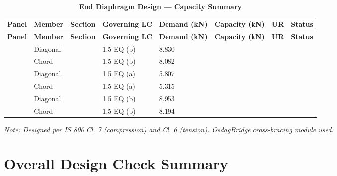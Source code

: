 \documentclass[12pt,a4paper]{report}
\numberwithin{table}{chapter}
\numberwithin{figure}{chapter}
\begin{document}
\begin{longtable}{|C{2.0cm}|L{1.8cm}|C{2.2cm}|C{3.0cm}|C{1.8cm}|C{1.8cm}|C{1.2cm}|C{1.8cm}|}
\caption{\textbf{End Diaphragm Design --- Capacity Summary}}
\hline
{} \textbf{Panel} & \textbf{Member} & \textbf{Section} & \textbf{Governing LC} & \textbf{Demand (kN)} & \textbf{Capacity (kN)} & \textbf{UR} & \textbf{Status} \\[6pt]
\hline
\endfirsthead
\hline
{} \textbf{Panel} & \textbf{Member} & \textbf{Section} & \textbf{Governing LC} & \textbf{Demand (kN)} & \textbf{Capacity (kN)} & \textbf{UR} & \textbf{Status} \\[6pt]
\hline
\endhead
{} & Diagonal &  & 1.5 EQ (b) & 8.830 &  &  &  \\[6pt]
 & Chord &  & 1.5 EQ (b) & 8.082 &  &  &  \\[6pt]
\hline
{} & Diagonal &  & 1.5 EQ (a) & 5.807 &  &  &  \\[6pt]
 & Chord &  & 1.5 EQ (a) & 5.315 &  &  &  \\[6pt]
\hline
{} & Diagonal &  & 1.5 EQ (b) & 8.953 &  &  &  \\[6pt]
 & Chord &  & 1.5 EQ (b) & 8.194 &  &  &  \\[6pt]
\hline
\end{longtable}
\noindent\textit{Note: Designed per IS 800 Cl. 7 (compression) and Cl. 6 (tension). OsdagBridge cross-bracing module used.}

\section{Overall Design Check Summary}
\label{sec:overall-summary}
\end{document}
